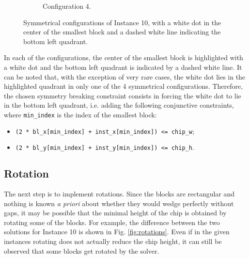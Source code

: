 \documentclass[a4paper, 12pt]{article}
\begin{document}
\begin{figure}
\begin{subfigure}[t]{0.45\textwidth}
        \caption{Configuration 4.}
    \end{subfigure}
    \caption[Symmetrical configurations.]{Symmetrical configurations of Instance 10, with a white dot in the center of the smallest block and a dashed white line indicating the bottom left quadrant.}
    \label{fig:solutions}  
\end{figure}

In each of the configurations, the center of the smallest block is highlighted with a white dot and the bottom left quadrant is indicated by a dashed white line. It can be noted that, with the exception of very rare cases, the white dot lies in the highlighted quadrant in only one of the 4 symmetrical configurations. Therefore, the chosen symmetry breaking constraint consists in forcing the white dot to lie in the bottom left quadrant, i.e. adding the following conjunctive constraints, where \verb|min_index| is the index of the smallest block:
\begin{itemize}
	\item \verb|(2 * bl_x[min_index] + inst_x[min_index]) <= chip_w|;
	\item \verb|(2 * bl_y[min_index] + inst_y[min_index]) <= chip_h|.
\end{itemize}

\subsection{Rotation}


The next step is to implement rotations. Since the blocks are rectangular and nothing is known \emph{a priori} about whether they would wedge perfectly without gaps, it may be possible that the minimal height of the chip is obtained by rotating some of the blocks. For example, the difference between the two solutions for Instance 10 is shown in Fig. \ref{fig:rotations}. Even if in the given instances rotating does not actually reduce the chip height, it can still be observed that some blocks get rotated by the solver.
\end{document}
